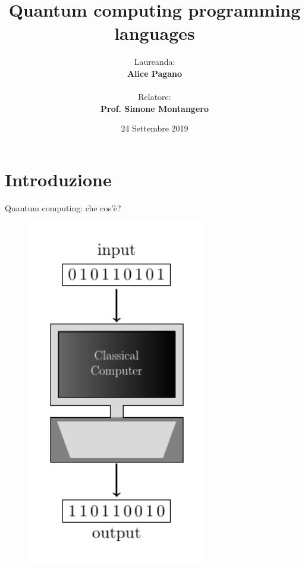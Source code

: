 \documentclass{beamer}
\title{Quantum computing programming languages}
\author
{
\parbox[t]{2cm}{Laureanda:} \textbf{Alice Pagano}\\
\parbox[t]{2cm}{Relatore:} \textbf{Prof. Simone Montangero}
}
\date
{
\vspace{2mm}
24 Settembre 2019
}
\renewcommand{\'}[0]{\`}
\begin{document}
	\maketitle

	\section{Introduzione}
	
	
	
	\begin{frame}{Quantum computing: che cos'è?}
	
	\begin{figure}[h!]
	\begin{columns}
 
	\centering \includegraphics[width=0.7\textwidth]{./tikz/Classical.pdf}
	

\end{columns}
\end{figure}
\end{frame}
\end{document}
